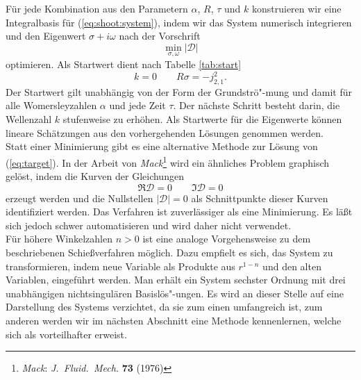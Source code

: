 \documentclass[10pt,a5paper,oneside,draft]{book}
\numberwithin{equation}{chapter}
\begin{document}
F\"ur jede Kombination aus den Parametern $\alpha$, $R$, $\tau$ und $k$ konstruieren wir eine Integralbasis f\"ur (\mbox{\ref{eq:shoot:system}}), indem wir das System numerisch integrieren und den Eigenwert $\sigma+i\omega$ nach der Vorschrift
\begin{equation}
	\min_{\sigma,\omega}|\mathscr{D}|
\end{equation}
optimieren.
Als Startwert dient nach Tabelle \mbox{\ref{tab:start}}
\begin{equation}\label{eq:startwert}
	k=0 \qquad R\sigma = -j_{2,1}^2.
\end{equation}
Der Startwert gilt unabh\"angig von der Form der Grundstr\"o"-mung und damit f\"ur alle Womersleyzahlen $\alpha$ und jede Zeit $\tau$.
Der n\"achste Schritt besteht darin, die Wellenzahl $k$ stufenweise zu erh\"ohen.
Als Startwerte f\"ur die Eigenwerte k\"onnen lineare Sch\"atzungen aus den vorhergehenden L\"osungen genommen werden.\\

Statt einer Minimierung gibt es eine alternative Methode zur L\"osung von (\mbox{\ref{eq:target}}).
In der Arbeit von \textsl{Mack}\footnote{\label{bib:mack}\textsl{Mack}: \textit{J.\ Fluid.\ Mech.} \textbf{73} (1976)}
wird ein \"ahnliches Problem graphisch gel\"ost, indem die Kurven der Gleichungen
\begin{equation}
	\Re\mathscr{D} = 0\qquad \Im\mathscr{D} = 0
\end{equation}
erzeugt werden und die Nullstellen $|\mathscr{D}|=0$ als Schnittpunkte dieser Kurven identifiziert werden.
Das Verfahren ist zuverl\"assiger als eine Minimierung.
Es l\"a\ss t sich jedoch schwer automatisieren und wird daher nicht verwendet.\\

F\"ur h\"ohere Winkelzahlen $n>0$ ist eine analoge Vorgehensweise zu dem beschriebenen Schie\ss verfahren m\"oglich.
Dazu empfielt es sich, das System zu transformieren, indem neue Variable als Produkte aus $r^{1-n}$ und den alten Variablen, eingef\"uhrt werden.
Man erh\"alt ein System sechster Ordnung mit drei unabh\"angigen nichtsingul\"aren Basisl\"os"-ungen.
Es wird an dieser Stelle auf eine Darstellung des Systems verzichtet, da sie zum einen umfangreich ist, zum anderen werden wir im n\"achsten Abschnitt eine Methode kennenlernen, welche sich als vorteilhafter erweist.\\
\end{document}
